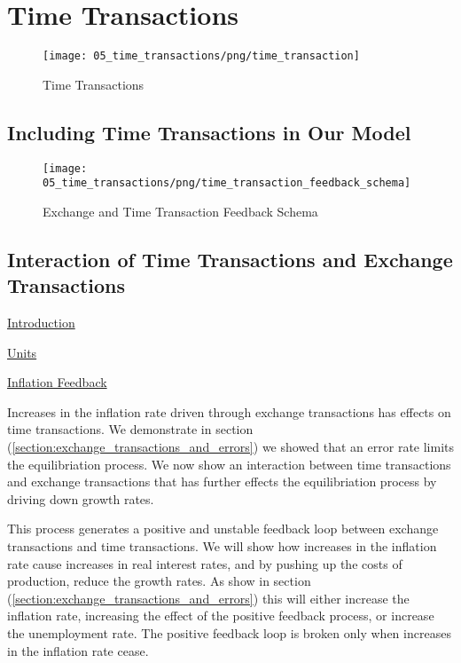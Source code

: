 \section{Time Transactions}
\label{section:time_transactions}

\begin{figure}[H]
\centering
\texttt{[image: 05\_time\_transactions/png/time\_transaction]}
\caption{Time Transactions}
\label{fig:time_transactions2}
\end{figure}

\subsection{Including Time Transactions in Our Model}

\begin{figure}[H]
\centering
\texttt{[image: 05\_time\_transactions/png/time\_transaction\_feedback\_schema]}
\caption{Exchange and Time Transaction Feedback Schema}
\label{fig:exchange_and_time_transaction_schema1}
\end{figure}

\subsection{Interaction of Time Transactions and Exchange Transactions}

\underline{Introduction}

\underline{Units}




\underline{Inflation Feedback}

Increases in the inflation rate driven through exchange transactions has effects on time
transactions. We demonstrate in section (\ref{section:exchange_transactions_and_errors}) we showed
that an error rate limits the equilibriation process. We now show an interaction between time
transactions and exchange transactions that has further effects the equilibriation process by
driving down growth rates.

This process generates a positive and unstable feedback loop between exchange transactions and time
transactions. We will show how increases in the inflation rate cause increases in real interest
rates, and by pushing up the costs of production, reduce the growth rates. As show in section
(\ref{section:exchange_transactions_and_errors}) this will either increase the inflation rate,
increasing the effect of the positive feedback process, or increase the unemployment rate. The
positive feedback loop is broken only when increases in the inflation rate cease.  

